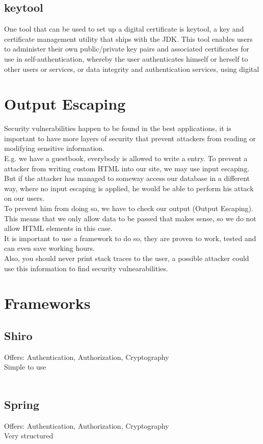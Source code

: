 \documentclass[12pt,a4paper]{report}
\begin{document}
\section{keytool}
One tool that can be used to set up a digital certificate is keytool, a key and certificate management utility that ships with the JDK. This tool enables users to administer their own public/private key pairs and associated certificates for use in self-authentication, whereby the user authenticates himself or herself to other users or services, or data integrity and authentication services, using digital 

\chapter{Output Escaping}
Security vulnerabilities happen to be found in the best applications, it is important to have more layers of security that prevent attackers from reading or modifying sensitive information.\\
E.g. we have a guestbook, everybody is allowed to write a entry. To prevent a attacker from writing custom HTML into our site, we may use input escaping. But if the attacker has managed to someway access our database in a different way, where no input escaping is applied, he would be able to perform his attack on our users.\\
To prevent him from doing so, we have to check our output (Output Escaping). This means that we only allow data to be passed that makes sense, so we do not allow HTML elements in this case.\\
It is important to use a framework to do so, they are proven to work, tested and can even save working hours.\\
Also, you should never print stack traces to the user, a possible attacker could use this information to find security vulnearabilities.

\chapter{Frameworks}
\section{Shiro}
Offers: Authentication, Authorization, Cryptography\\
Simple to use\\\\

\section{Spring}
Offers: Authentication, Authorization, Cryptography\\
Very structured\\\\
\end{document}
